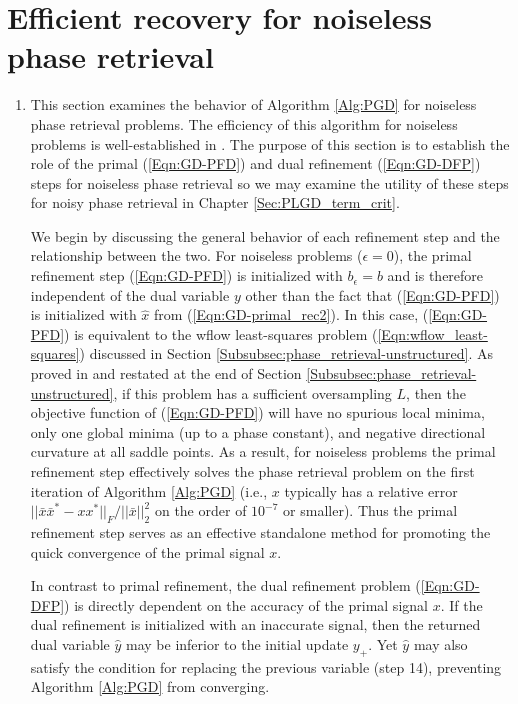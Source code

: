 \section{Efficient recovery for noiseless phase retrieval} 		\label{Subsec:PLGD_algo-noiseless_success}


\begin{enumerate}


\item

This section examines the behavior of Algorithm \ref{Alg:PGD} for noiseless phase retrieval problems.  The efficiency of this algorithm for noiseless problems is well-established in \cite[Sections 5.1.1, 5.1.3]{DBLP:journals/siamsc/FriedlanderM16}.  The purpose of this section is to establish the role of the primal (\ref{Eqn:GD-PFD}) and dual refinement (\ref{Eqn:GD-DFP}) steps for noiseless phase retrieval so we may examine the utility of these steps for noisy phase retrieval in Chapter \ref{Sec:PLGD_term_crit}.

We begin by discussing the general behavior of each refinement step and the relationship between the two.  For noiseless problems ($\epsilon = 0$), the primal refinement step (\ref{Eqn:GD-PFD}) is initialized with $b_\epsilon = b$ and is therefore independent of the dual variable $y$ other than the fact that (\ref{Eqn:GD-PFD}) is initialized with $\hat{x}$ from (\ref{Eqn:GD-primal_rec2}).  In this case, (\ref{Eqn:GD-PFD}) is equivalent to the wflow least-squares problem (\ref{Eqn:wflow_least-squares}) discussed in Section \ref{Subsubsec:phase_retrieval-unstructured}.  As proved in \cite{sun2016geometric} and restated at the end of Section \ref{Subsubsec:phase_retrieval-unstructured}, if this problem has a sufficient oversampling $L$, then the objective function of (\ref{Eqn:GD-PFD}) will have no spurious local minima, only one global minima (up to a phase constant), and negative directional curvature at all saddle points.  As a result, for noiseless problems the primal refinement step effectively solves the phase retrieval problem on the first iteration of Algorithm \ref{Alg:PGD} (i.e., $x$ typically has a relative error $|| \bar{x}\bar{x}^* - xx^* ||_F / ||\bar{x}||_2^2$ on the order of $10^{-7}$ or smaller).  Thus the primal refinement step serves as an effective standalone method for promoting the quick convergence of the primal signal $x$.

In contrast to primal refinement, the dual refinement problem (\ref{Eqn:GD-DFP}) is directly dependent on the accuracy of the primal signal $x$.  If the dual refinement is initialized with an inaccurate signal, then the returned dual variable $\hat{y}$ may be inferior to the initial update $y_+$.  Yet $\hat{y}$ may also satisfy the condition for replacing the previous variable (step 14), preventing Algorithm \ref{Alg:PGD} from converging.


\end{enumerate}
